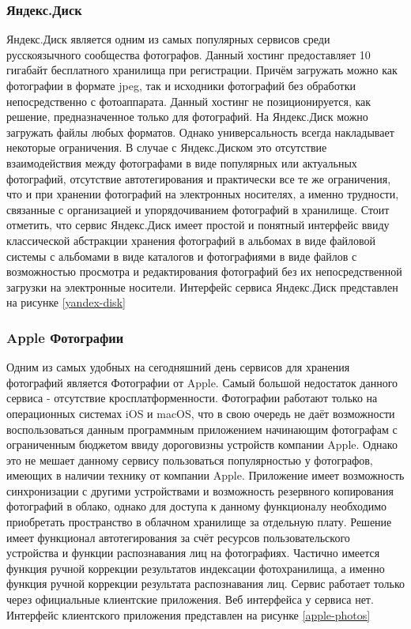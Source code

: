 \subsubsection{Яндекс.Диск}
Яндекс.Диск является одним из самых популярных сервисов среди русскоязычного сообщества фотографов. 
Данный хостинг предоставляет 10 гигабайт бесплатного хранилища при регистрации. 
Причём загружать можно как фотографии в формате jpeg, так и исходники фотографий без обработки непосредственно с фотоаппарата. 
Данный хостинг не позиционируется, как решение, предназначенное только для фотографий. 
На Яндекс.Диск можно загружать файлы любых форматов. 
Однако универсальность всегда накладывает некоторые ограничения. 
В случае с Яндекс.Диском это отсутствие взаимодействия между фотографами в виде популярных или актуальных фотографий, отсутствие автотегирования и практически все те же ограничения, что и при хранении фотографий на электронных носителях, а именно трудности, связанные с организацией и упорядочиванием фотографий в хранилище. 
Стоит отметить, что сервис Яндекс.Диск имеет простой и понятный интерфейс ввиду классической абстракции хранения фотографий в альбомах в виде файловой системы с альбомами в виде каталогов и фотографиями в виде файлов с возможностью просмотра и редактирования фотографий без их непосредственной загрузки на электронные носители. Интерфейс сервиса Яндекс.Диск представлен на рисунке \ref{yandex-disk}


\subsubsection{Apple Фотографии}
Одним из самых удобных на сегодняшний день сервисов для хранения фотографий является Фотографии от Apple.
Самый большой недостаток данного сервиса - отсутствие кросплатформенности. 
Фотографии работают только на операционных системах iOS и macOS, что в свою очередь не даёт возможности воспользоваться данным программным приложением начинающим фотографам с ограниченным бюджетом ввиду дороговизны устройств компании Apple.
Однако это не мешает данному сервису пользоваться популярностью у фотографов, имеющих в наличии технику от компании Apple. 
Приложение имеет возможность синхронизации с другими устройствами и возможность резервного копирования фотографий в облако, однако для доступа к данному функционалу необходимо приобретать пространство в облачном хранилище за отдельную плату.
Решение имеет функционал автотегирования за счёт ресурсов пользовательского устройства и функции распознавания лиц на фотографиях.
Частично имеется функция ручной коррекции результатов индексации фотохранилища, а именно функция ручной коррекции результата распознавания лиц.
Сервис работает только через официальные клиентские приложения.
Веб интерфейса у сервиса нет.
Интерфейс клиентского приложения представлен на рисунке \ref{apple-photos}


